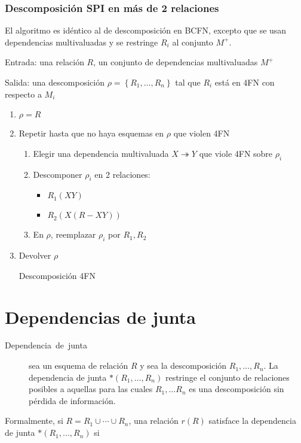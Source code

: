 \documentclass[a4paper, twoside]{article}
\begin{document}
\subsubsection{Descomposición SPI en más de 2 relaciones}

El algoritmo es idéntico al de descomposición en BCFN, excepto que
se usan dependencias multivaluadas y se restringe $R_{i}$ al conjunto
$M^{+}$.

\begin{algorithm}[H]
Entrada: una relación $R$, un conjunto de dependencias multivaluadas
$M^{+}$

Salida: una descomposición $\rho=\left\{ R_{1},\ldots,R_{n}\right\} $
tal que $R_{i}$ está en 4FN con respecto a $M_{i}$
\begin{enumerate}
\item $\rho=R$
\item Repetir hasta que no haya esquemas en $\rho$ que violen 4FN

\begin{enumerate}
\item Elegir una dependencia multivaluada $X\twoheadrightarrow Y$ que viole
4FN sobre $\rho_{i}$
\item Descomponer $\rho_{i}$ en 2 relaciones:

\begin{itemize}
\item $R_{1}\left(XY\right)$
\item $R_{2}\left(X(R-XY)\right)$
\end{itemize}
\item En $\rho$, reemplazar $\rho_{i}$ por $R_{1},R_{2}$
\end{enumerate}
\item Devolver $\rho$\protect\caption{Descomposición 4FN}
\end{enumerate}
\end{algorithm}



\section{Dependencias de junta}
\begin{description}
\item [{Dependencia~de~junta}] sea un esquema de relación $R$ y sea
la descomposición $R_{1},\ldots,R_{n}$. La dependencia de junta $*\left(R_{1},\ldots,R_{n}\right)$
restringe el conjunto de relaciones posibles a aquellas para las cuales
$R_{1},\ldots R_{n}$ es una descomposición sin pérdida de información.
\end{description}
Formalmente, si $R=R_{1}\cup\cdots\cup R_{n}$, una relación $r(R)$
satisface la dependencia de junta $*\left(R_{1},\ldots,R_{n}\right)$
si 
\end{document}
